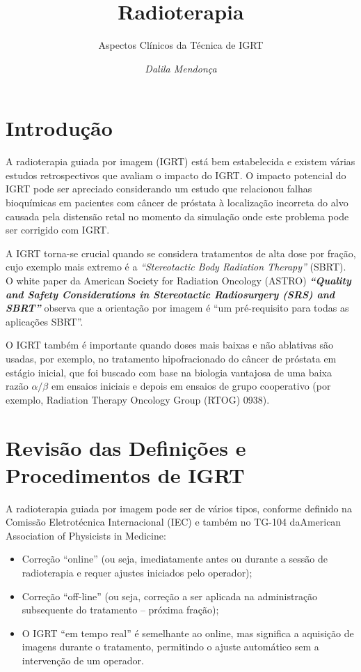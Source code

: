 \documentclass[11pt,a4paper]{article}
\title{\LobsterTwo\Huge{Radioterapia}}
\author{\LobsterTwo\Large{Aspectos Clínicos da Técnica de IGRT}\nocite{*}}
\date{\LobsterTwo\textit{Dalila Mendonça}}
\newcounter{exemplo}
\begin{document}
	\maketitle

\section{Introdução}

	A radioterapia guiada por imagem (IGRT) está bem estabelecida e existem várias estudos retrospectivos que avaliam o impacto do IGRT. O impacto potencial do IGRT pode ser apreciado considerando um estudo que relacionou falhas bioquímicas em pacientes com câncer de próstata à localização incorreta do alvo causada pela distensão retal no momento da simulação onde este problema pode ser corrigido com IGRT.

	A IGRT torna-se crucial quando se considera tratamentos de alta dose por fração, cujo exemplo mais extremo é a \textit{``Stereotactic Body Radiation Therapy''} (SBRT). O white paper da American Society for Radiation Oncology (ASTRO) \textbf{\textit{``Quality and Safety Considerations in Stereotactic Radiosurgery (SRS) and SBRT''}} observa que a orientação por imagem é “um pré-requisito para todas as aplicações SBRT”.

	O IGRT também é importante quando doses mais baixas e não ablativas são usadas, por exemplo, no tratamento hipofracionado do câncer de próstata em estágio inicial, que foi buscado com base na biologia vantajosa de uma baixa razão $\alpha/\beta$ em ensaios iniciais e depois em ensaios de grupo cooperativo (por exemplo, Radiation Therapy Oncology Group (RTOG) 0938).

\section{Revisão das Definições e Procedimentos de IGRT}

	A radioterapia guiada por imagem pode ser de vários tipos, conforme definido na Comissão Eletrotécnica Internacional (IEC) e também no TG-104 daAmerican Association of Physicists in Medicine:

	\begin{itemize}
		\item Correção “online” (ou seja, imediatamente antes ou durante a sessão de radioterapia e requer ajustes iniciados pelo operador);
		\item Correção “off-line” (ou seja, correção a ser aplicada na administração subsequente do tratamento -- próxima fração);
		\item O IGRT “em tempo real” é semelhante ao online, mas significa a aquisição de imagens durante o tratamento, permitindo o ajuste automático sem a intervenção de um operador.
	\end{itemize}
\end{document}
